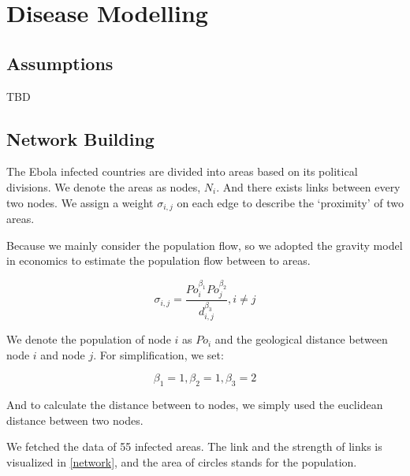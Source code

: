 \documentclass[11pt]{article}
\begin{document}
\section{Disease Modelling}
\label{dmodel}
\subsection{Assumptions}

TBD

\subsection{Network Building}

The Ebola infected countries are divided into areas based on its
 political divisions. We denote the areas as nodes, $N_i$. And there exists links between every two nodes. We assign a weight $\sigma_{i,j}$ on each edge to describe the `proximity' of two areas. 
 
Because we mainly consider the population flow, so we adopted the gravity model\cite{anderson2010gravity}\cite{karemera2000gravity} in economics to estimate the population flow between to areas.

$$\sigma_{i,j} = \frac{Po_i^{\beta_1}Po_j^{\beta_2}}{d_{i,j}^{\beta_3}}, i \neq j$$

We denote the population of node $i$ as $Po_i$ and the geological distance between node $i$ and node $j$. For simplification, we set:

$$\beta_1 = 1, \beta_2 = 1, \beta_3 = 2$$

And to calculate the distance between to nodes, we simply used the euclidean distance between two nodes.

We fetched the data of 55 infected areas. The link and the strength of links is visualized in \ref{network}, and the area of circles stands for the population.
\end{document}
